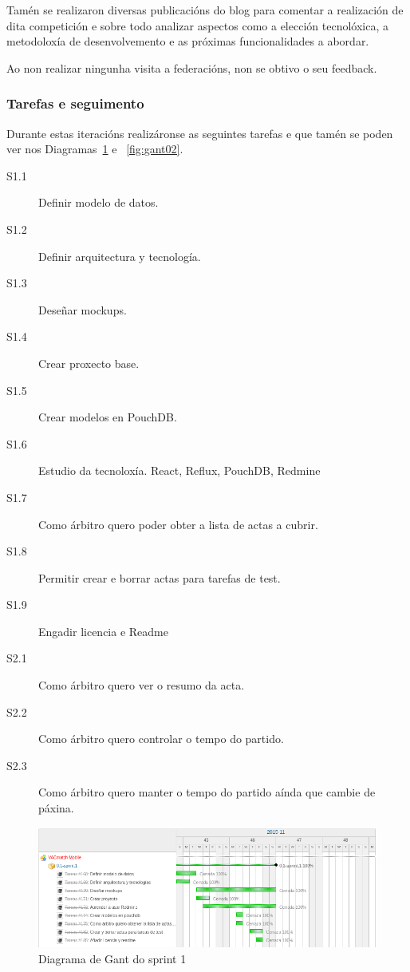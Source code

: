       Tamén se realizaron diversas publicacións do blog para comentar a 
realización de dita competición e sobre todo analizar aspectos como a elección 
tecnolóxica, a metodoloxía de desenvolvemento e as próximas funcionalidades a 
abordar.

  Ao non realizar ningunha visita a federacións, non se obtivo o seu feedback.

      \subsubsection{Tarefas e seguimento}

      Durante estas iteracións realizáronse as seguintes tarefas e que tamén se 
poden ver nos Diagramas~\ref{fig:gant01} e ~\ref{fig:gant02}.

        \begin{description}
         \item [S1.1] Definir modelo de datos.
         \item [S1.2] Definir arquitectura y tecnología.
         \item [S1.3] Deseñar mockups.
         \item [S1.4] Crear proxecto base.
         \item [S1.5] Crear modelos en PouchDB.
         \item [S1.6] Estudio da tecnoloxía. React, Reflux, PouchDB, Redmine
         \item [S1.7] Como árbitro quero poder obter a lista de actas a cubrir.
         \item [S1.8] Permitir crear e borrar actas para tarefas de test.
         \item [S1.9] Engadir licencia e Readme
         \item [S2.1] Como árbitro quero ver o resumo da acta.
         \item [S2.2] Como árbitro quero controlar o tempo do partido.
         \item [S2.3] Como árbitro quero manter o tempo do partido aínda que 
cambie de páxina.
         \end{description}

        \begin{figure}[h!]
          \begin{center}
          \includegraphics[width=\textwidth]{./img/gant_diagrams/01.png}
          \caption{Diagrama de Gant do sprint 1}
          \label{fig:gant01}
          \end{center}
        \end{figure}

